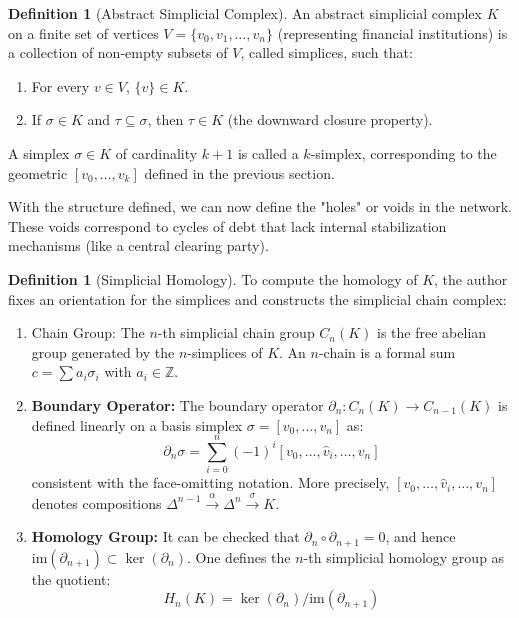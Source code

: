 \documentclass[12pt,reqno]{amsart}
\theoremstyle{definition}
\newtheorem{definition}[theorem]{Definition}
\numberwithin{equation}{section}
\begin{document}
    \begin{definition}[Abstract Simplicial Complex]
    An abstract simplicial complex $K$ on a finite set of vertices $V = \{v_0, v_1, \dots, v_n\}$ (representing financial institutions) is a collection of non-empty subsets of $V$, called simplices, such that:
    \begin{enumerate}
       \item For every $v \in V$, $\{v\} \in K$.
       \item If $\sigma \in K$ and $\tau \subseteq \sigma$, then $\tau \in K$ (the downward closure property).
    \end{enumerate}
    A simplex $\sigma \in K$ of cardinality $k+1$ is called a $k$-simplex, corresponding to the geometric $[v_0, \dots, v_k]$ defined in the previous section.
    \end{definition}

    With the structure defined, we can now define the "holes" or voids in the network. These voids correspond to cycles of debt that lack internal stabilization mechanisms (like a central clearing party).

    \begin{definition}[Simplicial Homology]
    To compute the homology of $K$, the author fixes an orientation for the simplices and constructs the simplicial chain complex:
    \begin{enumerate}
       \item Chain Group: The $n$-th simplicial chain group $C_n(K)$ is the free abelian group generated by the $n$-simplices of $K$. An $n$-chain is a formal sum $c = \sum a_i \sigma_i$ with $a_i \in \mathbb{Z}$.
       \item \textbf{Boundary Operator:} The boundary operator $\partial_n: C_n(K) \to C_{n-1}(K)$ is defined linearly on a basis simplex $\sigma = [v_0, \dots, v_n]$ as:
        \begin{equation}
             \partial_n \sigma = \sum_{i=0}^{n} (-1)^i [v_0, \dots, \hat{v}_i, \dots, v_n]
        \end{equation}
        consistent with the face-omitting notation. More precisely, $[v_0, \dots, \hat{v}_i, \dots, v_n]$ denotes compositions $\Delta^{n-1} \overset{\alpha}{\longrightarrow} \Delta^n \overset{\sigma}{\longrightarrow} K$.
    \item \textbf{Homology Group:} It can be checked that $\partial_{n} \circ \partial_{n+1} = 0$, and hence $\mathrm{im}( \partial_{n+1}) \subset \ker( \partial_n)$. One defines the $n$-th simplicial homology group as the quotient:
        \begin{equation}
             H_n(K) = \ker(\partial_n) / \text{im}(\partial_{n+1})
        \end{equation}
    \end{enumerate}
    \end{definition}
\end{document}
